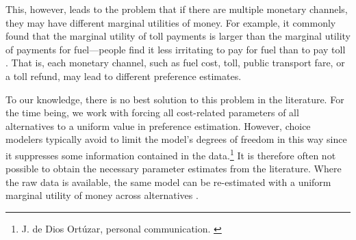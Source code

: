 This, however, leads to the problem that if there are multiple monetary channels, they may have different marginal utilities of money.  For example, it commonly found that the marginal utility of toll payments is larger than the marginal utility of payments for fuel---\ie people find it less irritating to pay for fuel than to pay toll 
%
%
\citep[see, e.g.,][]{VrticEtc2008ReisekostenSVIBericht}.
%
That is, each monetary channel, such as fuel cost, toll, public transport fare, or a toll refund, may lead to different preference estimates.

To our knowledge, there is no best solution to this problem in the literature.  For the time being, we work with forcing all cost-related parameters of all alternatives to a uniform value in preference estimation.
%
However, choice modelers typically avoid to limit the model's degrees of freedom in this way since it suppresses some information contained in the data.\footnote{%
%
J. de Dios Ort\'uzar, personal communication.
%
\label{fn:ortuzar-pers-com}}
%
It is therefore often not possible to obtain the necessary parameter estimates from the literature. Where the raw data is available, the same model can be re-estimated with a uniform marginal utility of money across alternatives
\citep[see, e.g.,][]{KickhoeferEtAl2011PolicyEvaluationIncome, TirachiniHensherRose_TransResB_2014}.

